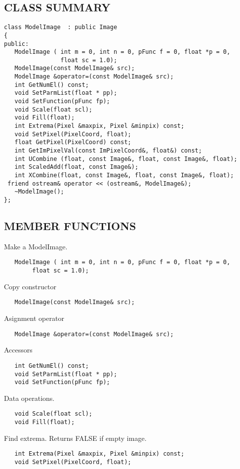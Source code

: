 \subsection*{CLASS SUMMARY}
\begin{verbatim}
class ModelImage  : public Image
{
public:
   ModelImage ( int m = 0, int n = 0, pFunc f = 0, float *p = 0,
                float sc = 1.0);
   ModelImage(const ModelImage& src);
   ModelImage &operator=(const ModelImage& src);
   int GetNumEl() const;
   void SetParmList(float * pp);
   void SetFunction(pFunc fp);
   void Scale(float scl);
   void Fill(float);
   int Extrema(Pixel &maxpix, Pixel &minpix) const;
   void SetPixel(PixelCoord, float);
   float GetPixel(PixelCoord) const;
   int GetImPixelVal(const ImPixelCoord&, float&) const;
   int UCombine (float, const Image&, float, const Image&, float);
   int ScaledAdd(float, const Image&);
   int XCombine(float, const Image&, float, const Image&, float);
 friend ostream& operator << (ostream&, ModelImage&);
   ~ModelImage();
};
\end{verbatim}

\subsection*{MEMBER FUNCTIONS}

      Make a ModelImage.
\begin{verbatim}
   ModelImage ( int m = 0, int n = 0, pFunc f = 0, float *p = 0, 
        float sc = 1.0);
\end{verbatim}

      Copy constructor
\begin{verbatim}
   ModelImage(const ModelImage& src);
\end{verbatim}

      Asignment operator
\begin{verbatim}
   ModelImage &operator=(const ModelImage& src);
\end{verbatim}

      Accessors
\begin{verbatim}
   int GetNumEl() const;
   void SetParmList(float * pp);
   void SetFunction(pFunc fp);
\end{verbatim}

      Data operations.
\begin{verbatim}
   void Scale(float scl);
   void Fill(float);
\end{verbatim}

      Find extrema. Returns FALSE if empty image.
\begin{verbatim}
   int Extrema(Pixel &maxpix, Pixel &minpix) const;
   void SetPixel(PixelCoord, float);
\end{verbatim}

